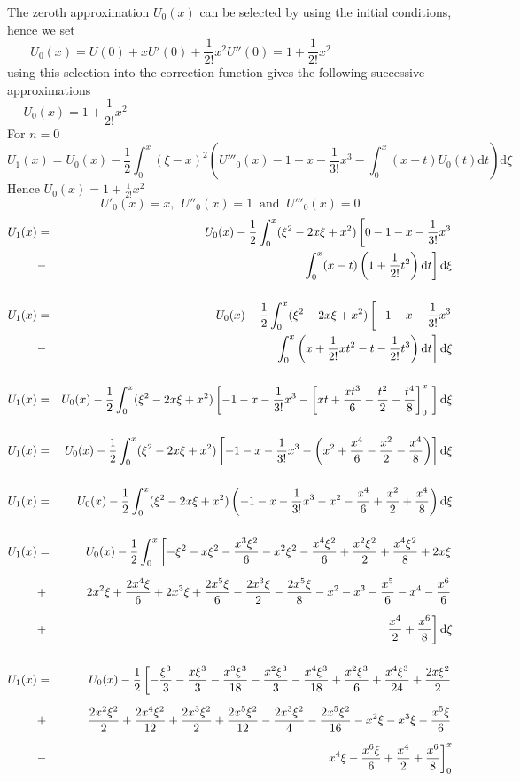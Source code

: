 \documentclass[12pt]{report}
\newcommand{\spn}[1]{\\[#1cm]}
\newcommand{\NI}{\noindent}
\newcommand{\dsp}{\displaystyle}
\begin{document}
	\NI The zeroth approximation $U_0(x)$ can be selected by using the initial conditions, hence we set
	\begin{equation}
		U_0(x) = U(0) + xU'(0) + \frac{1}{2!}x^2U''(0) = 1 + \frac{1}{2!}x^2 \qquad\qquad\qquad\qquad\label{eq:3_5}
	\end{equation}
	using this selection into the correction function gives the following successive approximations
	\begin{equation*}
		U_0(x) = 1 + \frac{1}{2!}x^2 \qquad\qquad\qquad\qquad\qquad\qquad\qquad\qquad\qquad\qquad\qquad\qquad\quad
	\end{equation*}
	For $n=0$
	\begin{equation*}
		U_1(x) = U_0(x) - \frac{1}{2}\int_0^x (\xi - x)^2 \left(U'''_0(x)-1-x-\frac{1}{3!}x^3 - \int_0^x(x-t)U_0(t)\text{d}t\right)\text{d}\xi
	\end{equation*}
	Hence $\dsp U_0(x) = 1 + \frac{1}{2!}x^2$
	$$U'_0(x)=x, ~~ U''_0(x)=1 ~\text{ and }~ U'''_0(x)=0$$
	\begin{eqnarray}
		U_1(x) &=& U_0(x) - \frac{1}{2}\int_0^x(\xi^2 - 2x\xi + x^2)\left[0-1-x-\frac{1}{3!}x^3\right.\notag\\
		&-& \left. \int_0^x (x-t)\left(1 + \frac{1}{2!} t^2\right)\text{d}t\right]\text{d}\xi \notag\spn{0.5}
		U_1(x) &=& U_0(x) - \frac{1}{2}\int_0^x(\xi^2 - 2x\xi + x^2)\left[-1-x-\frac{1}{3!}x^3\right.\notag\\
		&-& \left. \int_0^x \left(x + \frac{1}{2!}xt^2 - t - \frac{1}{2!}t^3\right)\text{d}t\right]\text{d}\xi \notag\spn{0.5}
		U_1(x) &=& U_0(x) - \frac{1}{2}\int_0^x(\xi^2 - 2x\xi + x^2)\left[-1-x-\frac{1}{3!}x^3 - \left[xt + \frac{xt^3}{6} - \frac{t^2}{2} - \frac{t^4}{8}\right]_0^x~\right]\text{d}\xi \notag\spn{0.5}
		U_1(x) &=& U_0(x) - \frac{1}{2}\int_0^x(\xi^2 - 2x\xi + x^2)\left[-1-x-\frac{1}{3!}x^3 - \left(x^2 + \frac{x^4}{6} - \frac{x^2}{2} - \frac{x^4}{8}\right)\right]\text{d}\xi \notag\spn{0.5}
		U_1(x) &=& U_0(x) - \frac{1}{2}\int_0^x(\xi^2 - 2x\xi + x^2)\left(-1-x-\frac{1}{3!}x^3 - x^2 - \frac{x^4}{6} + \frac{x^2}{2} + \frac{x^4}{8}\right)\text{d}\xi \notag \spn{0.5}
		U_1(x) &=& U_0(x) - \frac{1}{2}\int_0^x \left[-\xi^2 - x\xi^2 - \frac{x^3\xi^2}{6} - x^2\xi^2 - \frac{x^4\xi^2}{6} + \frac{x^2\xi^2}{2} + \frac{x^4\xi^2}{8} + 2x\xi\right. \notag \spn{0.2}
		&+&\left.2x^2\xi + \frac{2x^4\xi}{6} + 2x^3 \xi + \frac{2x^5\xi}{6} - \frac{2x^3\xi}{2} - \frac{2x^5\xi}{8} - x^2 - x^3 - \frac{x^5}{6} - x^4 -\frac{x^6}{6}\right. \notag \spn{0.2}
		&+& \left. \frac{x^4}{2} + \frac{x^6}{8}\right]\text{d}\xi \notag \spn{0.5}
		U_1(x) &=& U_0(x) - \frac{1}{2}\left[-\frac{\xi^3}{3} -\frac{x\xi^3}{3} - \frac{x^3\xi^3}{18} - \frac{x^2\xi^3}{3} - \frac{x^4\xi^3}{18} + \frac{x^2\xi^3}{6} + \frac{x^4\xi^3}{24} + \frac{2x\xi^2}{2}\right. \notag \spn{0.2}
		&+&\left.\frac{2x^2\xi^2}{2} + \frac{2x^4\xi^2}{12} + \frac{2x^3 \xi^2}{2} + \frac{2x^5\xi^2}{12} - \frac{2x^3\xi^2}{4} - \frac{2x^5\xi^2}{16} - x^2\xi - x^3\xi - \frac{x^5\xi}{6}\right. \notag \spn{0.2}
		&-& \left.x^4\xi -\frac{x^6\xi}{6} +\frac{x^4}{2} + \frac{x^6}{8}\right]_0^x \notag \spn{0.5}
	\end{eqnarray}
\end{document}
